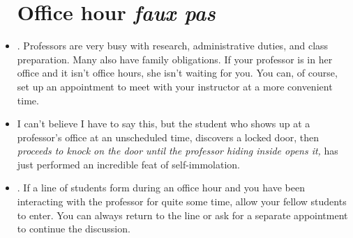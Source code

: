 \begin{itemize}

\section{Office hour \emph{faux pas}}

\item {}. Professors are very busy with research, administrative duties, and class preparation. Many also have family obligations. If your professor is in her office and it isn't office hours, she isn't waiting for you. You can, of course, set up an appointment to meet with your instructor at a more convenient time. 

\item {} I can't believe I have to say this, but the student who shows up at a professor's office at an unscheduled time, discovers a locked door, then \emph{proceeds to knock on the door until the professor hiding inside opens it,} has just performed an incredible feat of self-immolation.

\item {}. If a line of students form during an office hour and you have been interacting with the professor for quite some time, allow your fellow students to enter. You can always return to the line or ask for a separate appointment to continue the discussion. 



\end{itemize}
